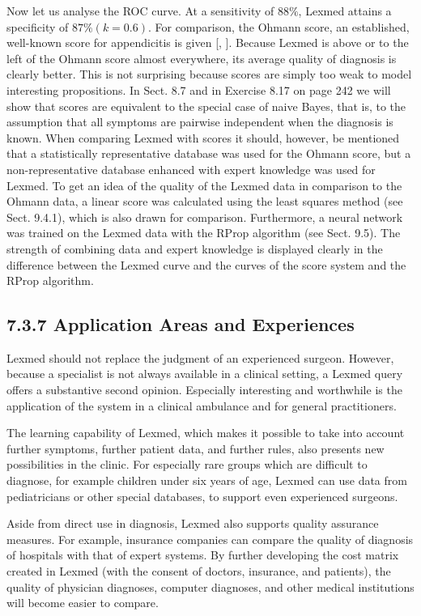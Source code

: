 \documentclass[10pt]{article}
\begin{document}
Now let us analyse the ROC curve. At a sensitivity of $88 \%$, Lexmed attains a specificity of $87 \%(k=0.6)$. For comparison, the Ohmann score, an established, well-known score for appendicitis is given [\cite{ohmann1996evaluation}, \cite{zielke1999appendizitis}]. Because Lexmed is above or to the left of the Ohmann score almost everywhere, its average quality of diagnosis is clearly better. This is not surprising because scores are simply too weak to model interesting propositions. In Sect. 8.7 and in Exercise 8.17 on page 242 we will show that scores are equivalent to the special case of naive Bayes, that is, to the assumption that all symptoms are pairwise independent when the diagnosis is known. When comparing Lexmed with scores it should, however, be mentioned that a statistically representative database was used for the Ohmann score, but a non-representative database enhanced with expert knowledge was used for Lexmed. To get an idea of the quality of the Lexmed data in comparison to the Ohmann data, a linear score was calculated using the least squares method (see Sect. 9.4.1), which is also drawn for comparison. Furthermore, a neural network was trained on the Lexmed data with the RProp algorithm (see Sect. 9.5). The strength of combining data and expert knowledge is displayed clearly in the difference between the Lexmed curve and the curves of the score system and the RProp algorithm.

\subsection*{7.3.7 Application Areas and Experiences}
Lexmed should not replace the judgment of an experienced surgeon. However, because a specialist is not always available in a clinical setting, a Lexmed query offers a substantive second opinion. Especially interesting and worthwhile is the application of the system in a clinical ambulance and for general practitioners.

The learning capability of Lexmed, which makes it possible to take into account further symptoms, further patient data, and further rules, also presents new possibilities in the clinic. For especially rare groups which are difficult to diagnose, for example children under six years of age, Lexmed can use data from pediatricians or other special databases, to support even experienced surgeons.

Aside from direct use in diagnosis, Lexmed also supports quality assurance measures. For example, insurance companies can compare the quality of diagnosis of hospitals with that of expert systems. By further developing the cost matrix created in Lexmed (with the consent of doctors, insurance, and patients), the quality of physician diagnoses, computer diagnoses, and other medical institutions will become easier to compare.
\end{document}

